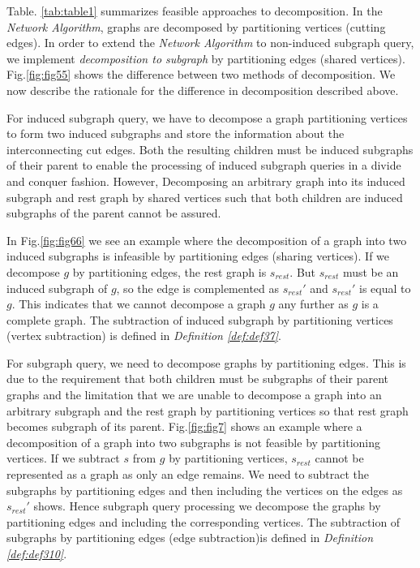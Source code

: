\begin{enumerate}
\begin{enumerate}
Table. \ref{tab:table1} summarizes feasible approaches to decomposition. 
In the \textit{Network Algorithm}, graphs are decomposed by partitioning vertices (cutting edges).
In order to extend the \textit{Network Algorithm} to non-induced subgraph query, we implement \textit{decomposition to subgraph} by partitioning edges (shared vertices). 
Fig.\ref{fig:fig55} shows the difference between two methods of decomposition. 
We now describe the rationale for the difference in decomposition described above.

For induced subgraph query, we have to decompose a graph partitioning vertices to form two induced subgraphs and store the information about the interconnecting cut edges. 
Both the resulting children must be induced subgraphs of their parent to enable the processing of induced subgraph queries in a divide and conquer fashion. 
However, Decomposing an arbitrary graph into its induced subgraph and rest graph by shared vertices such that both children are induced subgraphs of the parent cannot be assured.

In Fig.\ref{fig:fig66} we see an example where the decomposition of a graph into two induced subgraphs is infeasible by partitioning edges (sharing vertices).
If we decompose $g$ by partitioning edges, the rest graph is $s_{rest}$. But $s_{rest}$ must be an induced subgraph of $g$, so the edge is complemented as $s_{rest}'$ and $s_{rest}'$ is equal to $g$. 
This indicates that we cannot decompose a graph $g$ any further as $g$ is a complete graph.
The subtraction of induced subgraph by partitioning vertices (vertex subtraction)  is defined in \textit{Definition \ref{def:def37}}.

For subgraph query, we need to decompose graphs by partitioning edges. 
This is due to the requirement that both children must be subgraphs of their parent graphs
and the limitation that we are unable to decompose a graph into an arbitrary subgraph and the rest graph by partitioning vertices so that rest graph becomes subgraph of its parent.
Fig.\ref{fig:fig7} shows an example where a decomposition of a graph into two subgraphs is not feasible by partitioning vertices.
If we subtract $s$ from $g$ by partitioning vertices, $s_{rest}$ cannot be represented as a graph as only an edge remains. 
We need to subtract the subgraphs by partitioning edges and then including the vertices on the edges as $s_{rest}'$ shows. 
Hence subgraph query processing we decompose the graphs by partitioning edges and including the corresponding vertices.
The subtraction of subgraphs by partitioning edges (edge subtraction)is defined in \textit{Definition \ref{def:def310}}.


\end{enumerate}
\end{enumerate}

